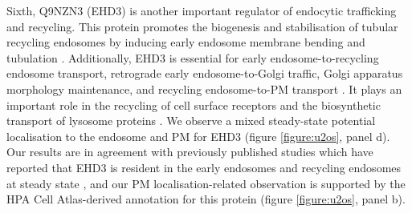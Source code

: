 \documentclass[12pt,english]{article}
\begin{document}
Sixth, Q9NZN3 (EHD3) is another important regulator of endocytic trafficking and recycling. This protein promotes the biogenesis and stabilisation of tubular recycling endosomes by inducing early endosome membrane bending and tubulation \citep{Bahl::2016,Henmi::2016}. Additionally, EHD3 is essential for early endosome-to-recycling endosome transport, retrograde early endosome-to-Golgi traffic, Golgi apparatus morphology maintenance, and recycling endosome-to-PM transport \citep{Naslavsky::2006,Naslavsky::2009,George::2007,Cabasso::2015, Henmi::2016}. It plays an important role in the recycling of cell surface receptors and the biosynthetic transport of lysosome proteins \citep{Naslavsky::2006,Naslavsky::2009,George::2007,Cabasso::2015}. We observe a mixed steady-state potential localisation to the endosome and PM for EHD3 (figure \ref{figure:u2os}, panel d). Our results are in agreement with previously published studies which have reported that EHD3 is resident in the early endosomes and recycling endosomes at steady state \citep{Naslavsky::2006,Naslavsky::2009,George::2007,Cabasso::2015}, and our PM localisation-related observation is supported by the HPA Cell Atlas-derived annotation for this protein (figure \ref{figure:u2os}, panel b).
\end{document}
